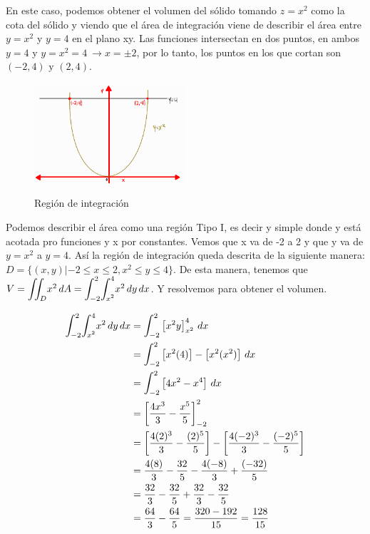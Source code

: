 \documentclass[12pt]{exam}
\begin{document}
\begin{questions}
\begin{enumerate}[a)]
  En este caso, podemos obtener el volumen del sólido tomando $z=x^2$ como la cota del sólido y viendo que el área de integración viene de describir el área entre $y=x^2$ y $y=4$ en el plano xy. Las funciones intersectan en dos puntos, en ambos $y=4$ y  $y=x^2 = 4 ~  \rightarrow x = \pm 2$, por lo tanto, los puntos en los que cortan son $(-2,4) \text{ y } (2,4)$.
  \begin{figure}[h]
      \centering
      \includegraphics[width=0.5\textwidth]{./img/i5e5.png}
      \label{fig:regionxy}
      \caption{Región de integración}
  \end{figure}

  Podemos describir el área como una región Tipo I, es decir y simple donde y está acotada pro funciones y x por constantes. Vemos que x va de -2 a 2 y que y va de $y=x^2$ a $y=4$.
  Así la región de integración queda descrita de la siguiente manera: $D = \{(x,y)| -2\leq x \leq 2 , x^2 \leq y \leq 4\}$.
  De esta manera, tenemos que $V  = \mathlarger{\iint}_D x^2 \,dA =  \mathlarger{\int}_{-2}^2\mathlarger{\int}_{x^2}^{4}x^2 \,dy\,dx $. Y resolvemos para obtener el volumen.

  \begin{align*}
    \mathlarger{\int}_{-2}^2\mathlarger{\int}_{x^2}^{4}x^2 \,dy\,dx
    &= \mathlarger{\int}_{-2}^2 \left[ x^2 y \right]_{x^2}^{4} \,dx\\
    &= \mathlarger{\int}_{-2}^2 \left[ x^2 (4) \right] - \left[ x^2 (x^2) \right] \,dx\\
    &= \mathlarger{\int}_{-2}^2 \left[ 4x^2 -  x^4 \right] \,dx\\
    &=  \left[ \frac{4x^3}{3}-  \frac{x^5}{5} \right]_{-2}^2\\
    &=  \left[ \frac{4(2)^3}{3}-  \frac{(2)^5}{5} \right] -  \left[ \frac{4(-2)^3}{3}-  \frac{(-2)^5}{5} \right] \\
    &=  \frac{4(8)}{3}-  \frac{32}{5} -  \frac{4(-8)}{3} +  \frac{(-32)}{5}  \\
      &=  \frac{32}{3}-  \frac{32}{5} +  \frac{32}{3} -  \frac{32}{5}  \\
      &=  \frac{64}{3}-  \frac{64}{5} = \frac{320-192}{15} = \frac{128}{15}
    \end{align*}


\end{enumerate}
\end{questions}
\end{document}
